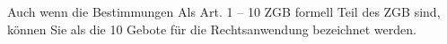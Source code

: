 Auch wenn die Bestimmungen Als Art. 1 -- 10 ZGB formell Teil des ZGB
sind, können Sie als die 10 Gebote für die Rechtsanwendung bezeichnet
werden. 
